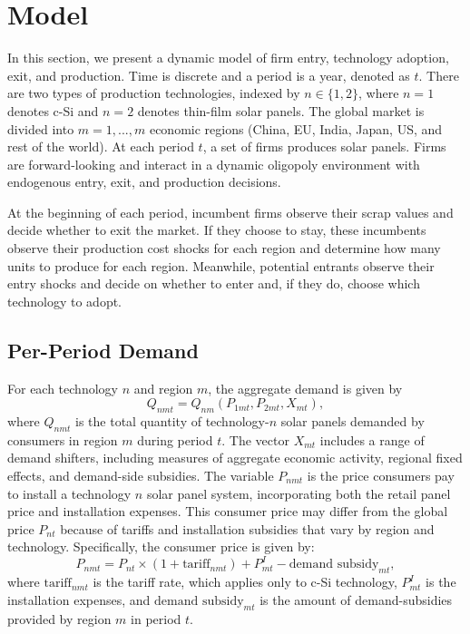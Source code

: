 \documentclass[12pt]{article}
\begin{document}
\newpage


\section{Model}\label{sec:LBDmodel}
In this section, we present a dynamic model of firm entry, technology adoption, exit, and production. Time is discrete and a period is a year, denoted as $t$. There are two types of production technologies, indexed by $n\in\{1,2\}$, where $n=1$ denotes c-Si and $n=2$ denotes thin-film solar panels. The global market is divided into $m=1,...,m$ economic regions (China, EU, India, Japan, US, and rest of the world). At each period $t$, a set of firms produces solar panels. Firms are forward-looking and interact in a dynamic oligopoly environment with endogenous entry, exit, and production decisions.

At the beginning of each period, incumbent firms observe their scrap values and decide whether to exit the market. If they choose to stay, these incumbents observe their production cost shocks for each region and determine how many units to produce for each region. Meanwhile, potential entrants observe their entry shocks and decide on whether to enter and, if they do, choose which technology to adopt. 



\subsection{Per-Period Demand}
For each technology $n$ and region $m$, the aggregate demand is given by
\begin{equation}
Q_{nmt}=Q_{nm}(P_{1mt},P_{2mt},X_{mt}), \label{eq:model_demand}
\end{equation}
where $Q_{nmt}$ is the total quantity of technology-$n$ solar panels demanded by consumers in region $m$ during period $t$. The vector $X_{mt}$ includes a range of demand shifters, including measures of aggregate economic activity, regional fixed effects, and demand-side subsidies. The variable $P_{nmt}$ is the price consumers pay to install a technology $n$ solar panel system, incorporating both the retail panel price and installation expenses. This consumer price may differ from the global price $P_{nt}$ because of tariffs and installation subsidies that vary by region and technology. Specifically, the consumer price is given by:
\[P_{nmt} = P_{nt}\times (1 + \text{tariff}_{nmt}) + P^{I}_{mt} - \text{demand subsidy}_{mt},\]
where $\text{tariff}_{nmt}$ is the tariff rate, which applies only to c-Si technology, $P^{I}_{mt}$ is the installation expenses, and $\text{demand subsidy}_{mt}$ is the amount of demand-subsidies provided by region $m$ in period $t$.
\end{document}
